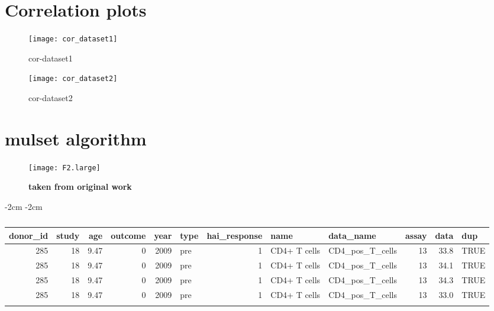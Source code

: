 \begin{appendices}

    \section{Correlation plots}

\begin{figure}[htpb]
    \centering
    \texttt{[image: cor\_dataset1]}
    \caption{cor-dataset1}
    \label{fig:cor-dataset1}
\end{figure}

\begin{figure}[htpb]
    \centering
    \texttt{[image: cor\_dataset2]}
    \caption{cor-dataset2}
    \label{fig:cor-dataset2}
\end{figure}

    \section{mulset algorithm}

\begin{figure}[htpb]
    \texttt{[image: F2.large]}
    \caption{\textbf{taken from original work}}\label{fig:mulsetAlg}
\end{figure}

\begin{table}[htpb]
\addtolength{\leftskip} {-2cm} %
\addtolength{\rightskip} {-2cm} %
\begin{tabular}{rrrrrlrllrrl}
\toprule{}
donor\_id & study & age & outcome & year & type & hai\_response & name & data\_name & assay & data & dup\\
\midrule{}
285 & 18 & 9.47 & 0 & 2009 & pre & 1 & CD4+ T cells & CD4\_pos\_T\_cells & 13 & 33.8 & TRUE\\
285 & 18 & 9.47 & 0 & 2009 & pre & 1 & CD4+ T cells & CD4\_pos\_T\_cells & 13 & 34.1 & TRUE\\
285 & 18 & 9.47 & 0 & 2009 & pre & 1 & CD4+ T cells & CD4\_pos\_T\_cells & 13 & 34.3 & TRUE\\
285 & 18 & 9.47 & 0 & 2009 & pre & 1 & CD4+ T cells & CD4\_pos\_T\_cells & 13 & 33.0 & TRUE\\
\bottomrule{}
\end{tabular}
    \caption{}\label{tbl:exampleDuplicate}
\end{table}




\end{appendices}
